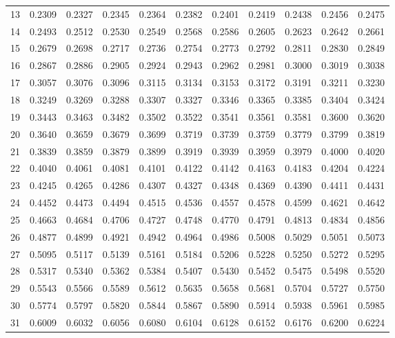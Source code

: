 {\begin{tabular}{|c|cccccccccc|}
13 & 0.2309 & 0.2327 & 0.2345 & 0.2364 & 0.2382 & 0.2401 & 0.2419 & 0.2438 & 0.2456 & 0.2475 \\
14 & 0.2493 & 0.2512 & 0.2530 & 0.2549 & 0.2568 & 0.2586 & 0.2605 & 0.2623 & 0.2642 & 0.2661 \\
\hline
15 & 0.2679 & 0.2698 & 0.2717 & 0.2736 & 0.2754 & 0.2773 & 0.2792 & 0.2811 & 0.2830 & 0.2849 \\
16 & 0.2867 & 0.2886 & 0.2905 & 0.2924 & 0.2943 & 0.2962 & 0.2981 & 0.3000 & 0.3019 & 0.3038 \\
17 & 0.3057 & 0.3076 & 0.3096 & 0.3115 & 0.3134 & 0.3153 & 0.3172 & 0.3191 & 0.3211 & 0.3230 \\
18 & 0.3249 & 0.3269 & 0.3288 & 0.3307 & 0.3327 & 0.3346 & 0.3365 & 0.3385 & 0.3404 & 0.3424 \\
19 & 0.3443 & 0.3463 & 0.3482 & 0.3502 & 0.3522 & 0.3541 & 0.3561 & 0.3581 & 0.3600 & 0.3620 \\
\hline
20 & 0.3640 & 0.3659 & 0.3679 & 0.3699 & 0.3719 & 0.3739 & 0.3759 & 0.3779 & 0.3799 & 0.3819 \\
21 & 0.3839 & 0.3859 & 0.3879 & 0.3899 & 0.3919 & 0.3939 & 0.3959 & 0.3979 & 0.4000 & 0.4020 \\
22 & 0.4040 & 0.4061 & 0.4081 & 0.4101 & 0.4122 & 0.4142 & 0.4163 & 0.4183 & 0.4204 & 0.4224 \\
23 & 0.4245 & 0.4265 & 0.4286 & 0.4307 & 0.4327 & 0.4348 & 0.4369 & 0.4390 & 0.4411 & 0.4431 \\
24 & 0.4452 & 0.4473 & 0.4494 & 0.4515 & 0.4536 & 0.4557 & 0.4578 & 0.4599 & 0.4621 & 0.4642 \\
\hline
25 & 0.4663 & 0.4684 & 0.4706 & 0.4727 & 0.4748 & 0.4770 & 0.4791 & 0.4813 & 0.4834 & 0.4856 \\
26 & 0.4877 & 0.4899 & 0.4921 & 0.4942 & 0.4964 & 0.4986 & 0.5008 & 0.5029 & 0.5051 & 0.5073 \\
27 & 0.5095 & 0.5117 & 0.5139 & 0.5161 & 0.5184 & 0.5206 & 0.5228 & 0.5250 & 0.5272 & 0.5295 \\
28 & 0.5317 & 0.5340 & 0.5362 & 0.5384 & 0.5407 & 0.5430 & 0.5452 & 0.5475 & 0.5498 & 0.5520 \\
29 & 0.5543 & 0.5566 & 0.5589 & 0.5612 & 0.5635 & 0.5658 & 0.5681 & 0.5704 & 0.5727 & 0.5750 \\
\hline
30 & 0.5774 & 0.5797 & 0.5820 & 0.5844 & 0.5867 & 0.5890 & 0.5914 & 0.5938 & 0.5961 & 0.5985 \\
31 & 0.6009 & 0.6032 & 0.6056 & 0.6080 & 0.6104 & 0.6128 & 0.6152 & 0.6176 & 0.6200 & 0.6224 \\

\end{tabular}}
